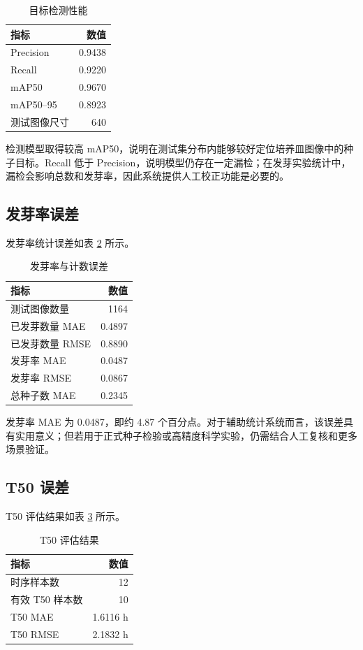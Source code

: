 \documentclass[UTF8,a4paper,zihao=-4]{ctexart}
\begin{document}
\begin{table}[htbp]
\centering
\caption{目标检测性能}
\label{tab:detection}
\begin{tabular}{lr}
\toprule
指标 & 数值 \\
\midrule
Precision & 0.9438 \\
Recall & 0.9220 \\
mAP50 & 0.9670 \\
mAP50--95 & 0.8923 \\
测试图像尺寸 & 640 \\
\bottomrule
\end{tabular}
\end{table}

检测模型取得较高 mAP50，说明在测试集分布内能够较好定位培养皿图像中的种子目标。Recall 低于 Precision，说明模型仍存在一定漏检；在发芽实验统计中，漏检会影响总数和发芽率，因此系统提供人工校正功能是必要的。

\subsection{发芽率误差}

发芽率统计误差如表 \ref{tab:germination_error} 所示。

\begin{table}[htbp]
\centering
\caption{发芽率与计数误差}
\label{tab:germination_error}
\begin{tabular}{lr}
\toprule
指标 & 数值 \\
\midrule
测试图像数量 & 1164 \\
已发芽数量 MAE & 0.4897 \\
已发芽数量 RMSE & 0.8890 \\
发芽率 MAE & 0.0487 \\
发芽率 RMSE & 0.0867 \\
总种子数 MAE & 0.2345 \\
\bottomrule
\end{tabular}
\end{table}

发芽率 MAE 为 0.0487，即约 4.87 个百分点。对于辅助统计系统而言，该误差具有实用意义；但若用于正式种子检验或高精度科学实验，仍需结合人工复核和更多场景验证。

\subsection{T50 误差}

T50 评估结果如表 \ref{tab:t50_error} 所示。

\begin{table}[htbp]
\centering
\caption{T50 评估结果}
\label{tab:t50_error}
\begin{tabular}{lr}
\toprule
指标 & 数值 \\
\midrule
时序样本数 & 12 \\
有效 T50 样本数 & 10 \\
T50 MAE & 1.6116 h \\
T50 RMSE & 2.1832 h \\
\bottomrule
\end{tabular}
\end{table}
\end{document}
